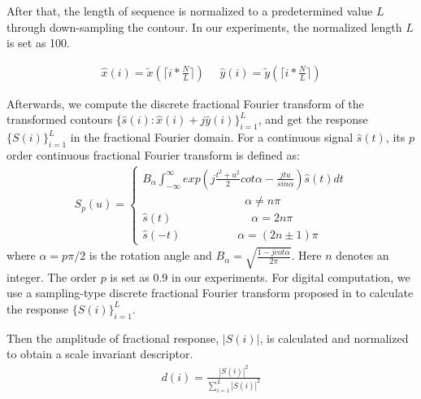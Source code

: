 \documentclass{article}
\begin{document}
After that, the length of sequence is normalized to a predetermined value $L$ through down-sampling the contour.
In our experiments, the normalized length $L$ is set as 100.

 \begin{equation} \label{eq5}
 \begin{aligned}
\hat{x}(i)=\tilde{x}(\lceil i*\frac{N}{L} \rceil)  \ \ \ \ \ \  \hat{y}(i)=\tilde{y}(\lceil i*\frac{N}{L} \rceil)
\end{aligned}
\end{equation}


Afterwards, we compute the discrete fractional Fourier transform of the transformed contours $\{\hat{s}(i):\hat{x}(i)+j\hat{y}(i)\}_{i=1}^{L}$,
and get the response $\{S(i)\}_{i=1}^{L}$ in the fractional Fourier domain.
For a continuous signal $\hat{s}(t)$, its $p$ order continuous fractional Fourier transform is defined as:
\begin{equation} \label{eq2}
 \begin{aligned}
 S_{p}(u)=
  \begin{cases}
B_{\alpha}\int_{-\infty}^{\infty}exp(j\frac{t^{2}+u^{2}}{2}cot\alpha-\frac{jtu}{sin\alpha})\hat{s}(t)dt \\
\quad \quad \quad \quad \quad \quad \quad \quad \quad   \alpha \neq n\pi \\
\hat{s}(t)     \quad \quad \quad \quad \quad \quad \quad \alpha =2n\pi \\
\hat{s}(-t)    \quad \quad \quad \quad \quad \alpha =(2n\pm1)\pi
  \end{cases}
 \end{aligned}
\end{equation}
where $\alpha=p\pi/2$ is the rotation angle and  $B_{\alpha}=\sqrt{\frac{1-jcot\alpha}{2\pi}}$.
Here  $n$ denotes an integer.
The order $p$ is set as $0.9$ in our experiments.
For digital computation, we use a sampling-type discrete fractional
Fourier transform proposed in \cite{Ozaktas} to calculate  the response $\{S(i)\}_{i=1}^{L}$. %


Then the amplitude of fractional response, $|S(i)|$, is calculated and normalized to obtain a scale invariant descriptor.
 \begin{equation} \label{eq5}
 \begin{aligned}
d(i)=\frac{|S(i)|^{2}}{\sum_{i=1}^{L}|S(i)|^{2}}
\end{aligned}
\end{equation}
\end{document}
